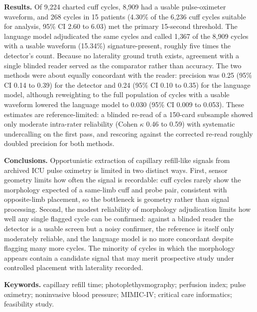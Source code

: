 \documentclass[twocolumn,letterpaper,10pt]{article}
\begin{document}
\textbf{Results.} Of 9{,}224 charted cuff cycles, 8{,}909 had a usable pulse-oximeter waveform, and 268 cycles in 15 patients (4.30\% of the 6{,}236 cuff cycles suitable for analysis, 95\% CI 2.60 to 6.03) met the primary 15-second threshold. The language model adjudicated the same cycles and called 1{,}367 of the 8{,}909 cycles with a usable waveform (15.34\%) signature-present, roughly five times the detector's count. Because no laterality ground truth exists, agreement with a single blinded reader served as the comparator rather than accuracy. The two methods were about equally concordant with the reader: precision was 0.25 (95\% CI 0.14 to 0.39) for the detector and 0.24 (95\% CI 0.10 to 0.35) for the language model, although reweighting to the full population of cycles with a usable waveform lowered the language model to 0.030 (95\% CI 0.009 to 0.053). These estimates are reference-limited: a blinded re-read of a 150-card subsample showed only moderate intra-rater reliability (Cohen $\kappa$ 0.46 to 0.59) with systematic undercalling on the first pass, and rescoring against the corrected re-read roughly doubled precision for both methods.

\textbf{Conclusions.} Opportunistic extraction of capillary refill-like signals from archived ICU pulse oximetry is limited in two distinct ways. First, sensor geometry limits how often the signal is recordable: cuff cycles rarely show the morphology expected of a same-limb cuff and probe pair, consistent with opposite-limb placement, so the bottleneck is geometry rather than signal processing. Second, the modest reliability of morphology adjudication limits how well any single flagged cycle can be confirmed: against a blinded reader the detector is a usable screen but a noisy confirmer, the reference is itself only moderately reliable, and the language model is no more concordant despite flagging many more cycles. The minority of cycles in which the morphology appears contain a candidate signal that may merit prospective study under controlled placement with laterality recorded.

\textbf{Keywords.} capillary refill time; photoplethysmography; perfusion index; pulse oximetry; noninvasive blood pressure; MIMIC-IV; critical care informatics; feasibility study.

\noindent\hrulefill
\fi

\end{document}
